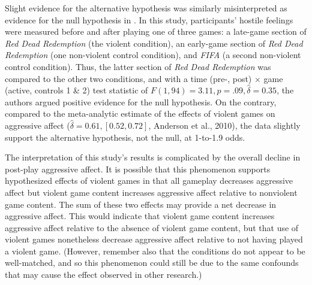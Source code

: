 \documentclass[man]{apa6}
\begin{document}
Slight evidence for the alternative hypothesis was similarly misinterpreted as evidence for the null hypothesis in \citet{Valadez:Ferguson:2012}. In this study, participants' hostile feelings were measured before and after playing one of three games: a late-game section of {\em Red Dead Redemption} (the violent condition), an early-game section of {\em Red Dead Redemption} (one non-violent control condition), and {\em FIFA} (a second non-violent control condition). Thus, the latter section of {\em Red Dead Redemption} was compared to the other two conditions, and with a time (pre-, post) $\times$ game (active, controls 1 \& 2) test statistic of $F(1, 94) = 3.11, p = .09, \hat{\delta} = 0.35$, the authors argued positive evidence for the null hypothesis. On the contrary, compared to the meta-analytic estimate of the effects of violent games on aggressive affect ($\hat{\delta} = 0.61, [0.52, 0.72]$, Anderson et al., 2010), the data slightly support the alternative hypothesis, not the null, at 1-to-1.9 odds. 



The interpretation of this study's results is complicated by the overall decline in post-play aggressive affect. It is possible that this phenomenon supports hypothesized effects of violent games in that all gameplay decreases aggressive affect but violent game content increases aggressive affect relative to nonviolent game content. The sum of these two effects may provide a net decrease in aggressive affect. This would indicate that violent game content increases aggressive affect relative to the absence of violent game content, but that use of violent games nonetheless decrease aggressive affect relative to not having played a violent game. (However, remember also that the conditions do not appear to be well-matched, and so this phenomenon could still be due to the same confounds that may cause the effect observed in other research.) 
\end{document}
